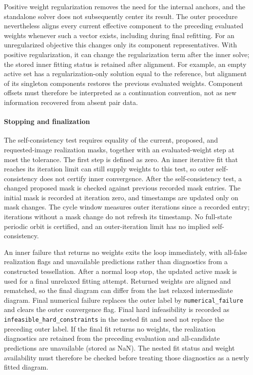 Positive weight regularization removes the need for the internal anchors, and the standalone solver does not subsequently center its result. The outer procedure nevertheless aligns every current effective component to the preceding evaluated weights whenever such a vector exists, including during final refitting. For an unregularized objective this changes only its component representatives. With positive regularization, it can change the regularization term after the inner solve; the stored inner fitting status is retained after alignment. For example, an empty active set has a regularization-only solution equal to the reference, but alignment of its singleton components restores the previous evaluated weights. Component offsets must therefore be interpreted as a continuation convention, not as new information recovered from absent pair data.

\paragraph{Stopping and finalization}
The self-consistency test requires equality of the current, proposed, and requested-image realization masks, together with an evaluated-weight step at most the tolerance. The first step is defined as zero. An inner iterative fit that reaches its iteration limit can still supply weights to this test, so outer self-consistency does not certify inner convergence. After the self-consistency test, a changed proposed mask is checked against previous recorded mask entries. The initial mask is recorded at iteration zero, and timestamps are updated only on mask changes. The cycle window measures outer iterations since a recorded entry; iterations without a mask change do not refresh its timestamp. No full-state periodic orbit is certified, and an outer-iteration limit has no implied self-consistency.

An inner failure that returns no weights exits the loop immediately, with all-false realization flags and unavailable predictions rather than diagnostics from a constructed tessellation. After a normal loop stop, the updated active mask is used for a final unrelaxed fitting attempt. Returned weights are aligned and rematched, so the final diagram can differ from the last relaxed intermediate diagram. Final numerical failure replaces the outer label by \texttt{numerical\_failure} and clears the outer convergence flag. Final hard infeasibility is recorded as \texttt{infeasible\_hard\_constraints} in the nested fit and need not replace the preceding outer label. If the final fit returns no weights, the realization diagnostics are retained from the preceding evaluation and all-candidate predictions are unavailable (stored as NaN). The nested fit status and weight availability must therefore be checked before treating those diagnostics as a newly fitted diagram.

